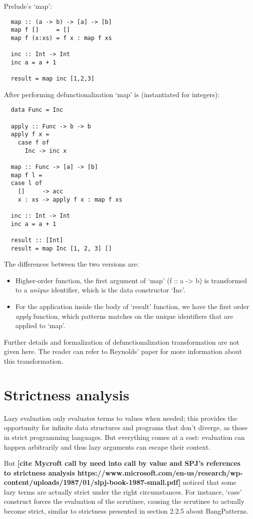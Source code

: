 \documentclass[diploma]{softlab-thesis}
\begin{document}
Prelude's `map':

\begin{verbatim}
  map :: (a -> b) -> [a] -> [b]
  map f []     = []
  map f (x:xs) = f x : map f xs

  inc :: Int -> Int 
  inc a = a + 1
  
  result = map inc [1,2,3]
\end{verbatim}

After performing defunctionalization `map' is (instantiated for integers):
\begin{verbatim}
  data Func = Inc 

  apply :: Func -> b -> b
  apply f x =
    case f of
      Inc -> inc x

  map :: Func -> [a] -> [b]
  map f l =
  case l of
    []     -> acc
    x : xs -> apply f x : map f xs

  inc :: Int -> Int 
  inc a = a + 1

  result :: [Int]
  result = map Inc [1, 2, 3] []
\end{verbatim}

The differences between the two versions are:
\begin{itemize}
  \item Higher-order function, the first argument of `map' (f :: a -> b) is 
  transformed to a \textit{unique} identifier, which is the data constructor `Inc'.
  \item For the application inside the body of `result' function, we have the first order \textit{apply}
  function, which patterns matches on the unique identifiers that are applied to `map'.
\end{itemize}

Further details and formalization of defunctionalization transformation are not given here. 
The reader can refer to Reynolds' paper for more information about this transformation.

\section {Strictness analysis}

Lazy evaluation only evaluates terms to values when needed; this provides the 
opportunity for infinite data structures and programs that don't diverge, as those in 
strict programming languages. But everything comes at a cost: evaluation can happen 
arbitrarily and thus lazy arguments can escape their context.

But \cite{Mycroft:1980:TPT:647324.721526}
\textbf{[cite Mycroft call by need into call by value and SPJ's references to 
strictness analysis https://www.microsoft.com/en-us/research/wp-content/uploads/1987/01/slpj-book-1987-small.pdf]} 
noticed that some lazy terms are actually strict under the right circumstances. For instance, `case' 
construct forces the evaluation of the scrutinee, causing the scrutinee to actually become strict, 
similar to strictness presented in section 2.2.5 about BangPatterns. 
\end{document}
